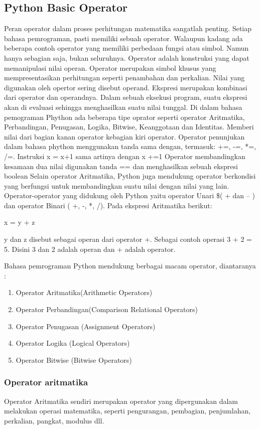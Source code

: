 \subsection{Python Basic Operator}
Peran operator dalam proses perhitungan matematika sangatlah penting.
Setiap bahasa pemrograman, pasti memiliki sebuah operator. Walaupun kadang ada beberapa contoh operator yang memiliki perbedaan fungsi atau simbol. Namun hanya sebagian saja, bukan seluruhnya. Operator adalah konstruksi yang dapat memanipulasi nilai operan.
Operator merupakan simbol khusus yang mempresentasikan perhitungan seperti penambahan dan perkalian. Nilai yang digunakan oleh opertor sering disebut operand. Ekspresi merupakan kombinasi dari operator dan operandnya. Dalam sebuah eksekusi program, suatu ekspresi akan di evaluasi sehingga menghasilkan suatu nilai tunggal. Di dalam bahasa pemograman Phython ada beberapa tipe oprator seperti operator Aritmatika, Perbandingan, Penugasan, Logika, Bitwise, Keanggotaan dan Identitas.
Memberi nilai dari bagian kanan operator kebagian kiri operator. Operator penunjukan dalam bahasa phython menggunakan tanda sama dengan, termasuk:
+=, -=, *=, /=. 
Instruksi x = x+1 sama artinya dengan x +=1
Operator membandingkan kesamaan dua nilai digunakan tanda == dan menghasilkan sebuah ekspresi boolean 
Selain operator Aritmatika, Python juga mendukung operator berkondisi yang berfungsi untuk membandingkan suatu nilai dengan nilai yang lain. Operator-operator yang didukung oleh Python yaitu operator Unari \$( + dan – ) dan operator Binari ( +, -, *, /). Pada ekspresi Aritmatika berikut:

x = y + z
 
y dan z disebut sebagai operan dari operator +.  
Sebagai contoh operasi 3 + 2 = 5. Disini 3 dan 2 adalah operan dan + adalah operator.

Bahasa pemrograman Python mendukung berbagai macam operator, diantaranya :
\begin{enumerate}
	\item Operator Aritmatika(Arithmetic Operators)
	\item Operator Perbandingan(Comparison Relational Operators)
	\item Operator Penugasan (Assignment Operators)
	\item Operator Logika (Logical Operators)
	\item Operator Bitwise (Bitwise Operators)
\end{enumerate}  


\subsubsection{Operator aritmatika}
Operator Aritmatika sendiri merupakan operator yang dipergunakan dalam melakukan operasi matematika, seperti pengurangan, pembagian, penjumlahan, perkalian, pangkat, modulus dll. 

